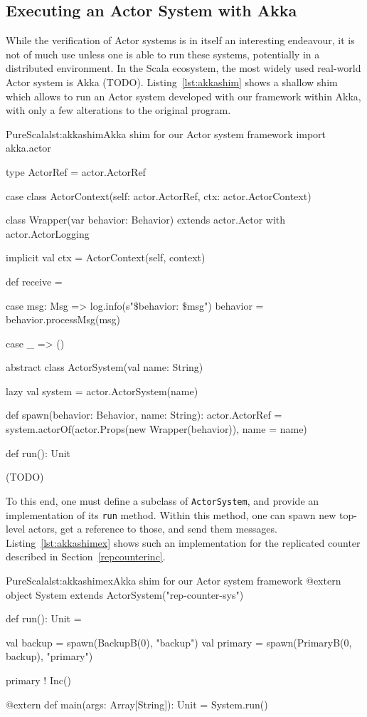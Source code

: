 \documentclass[a4paper,twoside]{article}
\newcommand{\TODO}[1]{\textcolor{YellowOrange}{(TODO)}} %
\newcommand{\RefSec}[1]{Section~\ref{#1}}
\newcommand{\RefCode}[1]{Listing~\ref{#1}}
\newcommand{\stt}[1]{\texttt{\small{#1}}}
\begin{document}
\subsection{Executing an Actor System with Akka}
\label{akka}

While the verification of Actor systems is in itself an interesting endeavour, it is not of much use unless one is able to run these systems, potentially in a distributed environment. In the Scala ecosystem, the most widely used real-world Actor system is Akka \TODO{REF}. \RefCode{lst:akkashim} shows a shallow shim which allows to run an Actor system developed with our framework within Akka, with only a few alterations to the original program.

\begin{Code}{PureScala}{lst:akkashim}{Akka shim for our Actor system framework}
import akka.actor

type ActorRef = actor.ActorRef

case class ActorContext(self: actor.ActorRef, ctx: actor.ActorContext)

class Wrapper(var behavior: Behavior)
  extends actor.Actor with actor.ActorLogging {

  implicit val ctx = ActorContext(self, context)

  def receive = {
    case msg: Msg =>
      log.info(s"$\$${behavior}: $\$${msg}")
      behavior = behavior.processMsg(msg)

    case _ => ()
  }
}

abstract class ActorSystem(val name: String) {
  lazy val system = actor.ActorSystem(name)

  def spawn(behavior: Behavior, name: String): actor.ActorRef = {
    system.actorOf(actor.Props(new Wrapper(behavior)), name = name)
  }

  def run(): Unit
}
\end{Code}

\TODO{Explain shim}

To this end, one must define a subclass of \stt{ActorSystem}, and provide an implementation of its \stt{run} method. Within this method, one can spawn new top-level actors, get a reference to those, and send them messages. \RefCode{lst:akkashimex} shows such an implementation for the replicated counter described in \RefSec{repcounterinc}. 

\begin{Code}{PureScala}{lst:akkashimex}{Akka shim for our Actor system framework}
@extern
object System extends ActorSystem("rep-counter-sys") {
  def run(): Unit = {
    val backup  = spawn(BackupB(0), "backup")
    val primary = spawn(PrimaryB(0, backup), "primary")

    primary ! Inc()
  }
}

@extern
def main(args: Array[String]): Unit = {
  System.run()
}
\end{Code}
\end{document}
